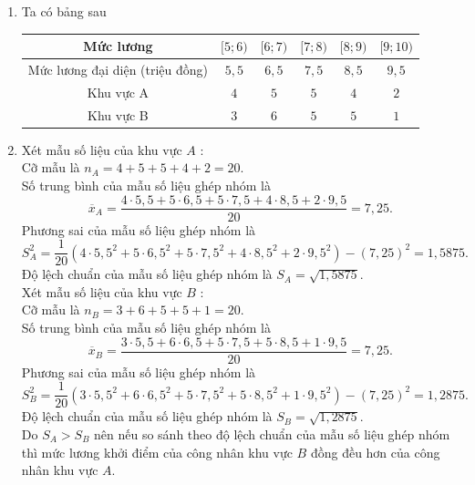 \begin{bt}
{\begin{enumerate}
			 \item Ta có bảng sau
			\begin{longtable}{|c|c|c|c|c|c|}
				\hline 
				Mức lương &  $[5;6)$ & $[6;7)$ & $[7;8)$ & $[8;9)$ & $[9;10)$\\
				\hline 
				Mức lương đại diện (triệu đồng) & $5{,}5$  & $6{,}5$ & $7{,}5$ & $8{,}5$ & $9{,}5$\\
				 \hline
				 Khu vực A & $4$ & $5$ & $5$ & $4$ & $2$\\
				\hline 
				Khu vực B & $3$ & $6$ & $5$ &  $5$ & $1$\\
				\hline 
			\end{longtable}
			\item Xét mẫu số liệu  của khu vực $A$ :\\
			Cỡ  mẫu là $n_A=4+5+5+4+2=20$.\\
			Số trung bình của mẫu số liệu ghép nhóm là  $$\overline{x}_A=\dfrac{4\cdot 5{,}5+5\cdot 6{,}5+5\cdot 7{,}5+4\cdot 8{,}5+2\cdot 9{,}5}{20}=7{,}25.$$
			 Phương sai của mẫu số liệu ghép nhóm là\\
			$$  S_A^2=\dfrac{1}{20}\left(4\cdot{5{,}5^2}+5\cdot{6{,}5^2}+5\cdot{7{,}5^2}+4\cdot{8{,}5^2}+2\cdot{9{,}5^2}\right)-(7{,}25)^2=1{,}5875.$$
			Độ lệch chuẩn của mẫu số liệu ghép nhóm là  $S_A=\sqrt{1{,}5875}$.\\
			 Xét mẫu số liệu của khu vực $B$ :\\
			Cỡ mẫu là $n_B=3+6+5+5+1=20$.\\ 
			Số trung bình của mẫu số liệu ghép nhóm là $$\overline{x}_B=\dfrac{3\cdot 5{,}5+6\cdot  6{,}5+5\cdot 7{,}5+5\cdot 8{,}5+1\cdot 9{,}5}{20}=7{,}25.$$
			Phương  sai của mẫu số liệu ghép nhóm là\\
			 $$ S_B^2=\dfrac{1}{20}\left(3\cdot{5{,}5^2}+6\cdot{6{,}5^2}+5\cdot{7{,}5^2}+5\cdot{8{,}5^2}+1\cdot{9{,}5^2}\right)-(7{,}25)^2=1{,}2875.$$
			Độ lệch chuẩn của mẫu số liệu ghép nhóm là $S_B=\sqrt{1{,}2875}$.\\ 
			Do $S_A>S_B$ nên nếu so sánh theo độ lệch chuẩn của mẫu số liệu ghép nhóm thì mức lương khởi điểm của công nhân  khu vực $B$ đồng đều hơn của công nhân khu vực $A$.
		\end{enumerate}
	 }
\end{bt}

